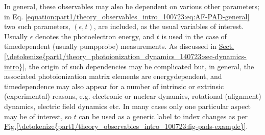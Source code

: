 \documentclass[letterpaper,table,10pt,english]{jupyterBook}
\begin{document}
\sphinxAtStartPar
In general, these observables may also be dependent on various other parameters; in Eq. \eqref{equation:part1/theory_observables_intro_100723:eq:AF-PAD-general} two such parameters, \((\epsilon,t)\), are included, as the usual variables of interest. Usually \(\epsilon\) denotes the photoelectron energy, and \(t\) is used in the case of time\sphinxhyphen{}dependent (usually pump\sphinxhyphen{}probe) measurements. As discussed in \hyperref[\detokenize{part1/theory_photoionization_dynamics_140723:sec-dynamics-intro}]{Sect.\@ \ref{\detokenize{part1/theory_photoionization_dynamics_140723:sec-dynamics-intro}}}, the origin of such dependencies may be complicated but, in general, the associated photoionization matrix elements are energy\sphinxhyphen{}dependent, and time\sphinxhyphen{}dependence may also appear for a number of intrinsic or extrinsic (experimental) reasons, e.g. electronic or nuclear dynamics, rotational (alignment) dynamics, electric field dynamics etc. In many cases only one particular aspect may be of interest, so \(t\) can be used as a generic label to index changes as per \hyperref[\detokenize{part1/theory_observables_intro_100723:fig-pads-example}]{Fig.\@ \ref{\detokenize{part1/theory_observables_intro_100723:fig-pads-example}}}.
\end{document}
